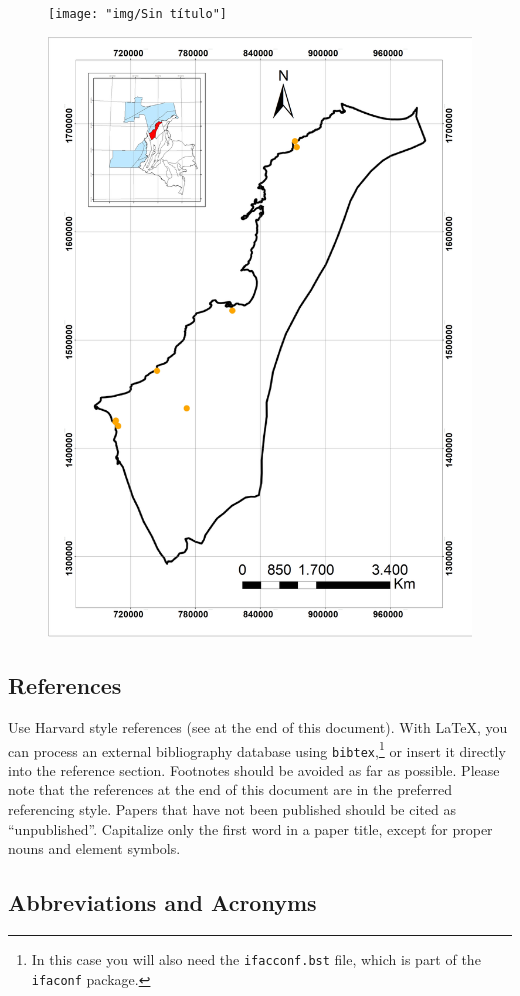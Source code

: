 \documentclass{ifacconf}
\begin{document}
\begin{figure}
	\centering
	\texttt{[image: "img/Sin título"]}
	\caption[centroidesemisiones]{}
	\label{fig:sin-titulo}
\end{figure}
\begin{figure}
	\centering
	\includegraphics[width=0.7\linewidth]{img/Volcanes}
	\caption[volcanes]{}
	\label{fig:volcanes}
\end{figure}


\subsection{References}

Use Harvard style references (see at the end of this document). With
\LaTeX, you can process an external bibliography database 
using \texttt{bibtex},\footnote{In this case you will also need the \texttt{ifacconf.bst}
file, which is part of the \texttt{ifaconf} package.}
or insert it directly into the reference section. Footnotes should be avoided as
far as possible.  Please note that the references at the end of this
document are in the preferred referencing style. Papers that have not
been published should be cited as ``unpublished''.  Capitalize only the
first word in a paper title, except for proper nouns and element
symbols.

\subsection{Abbreviations and Acronyms}
\end{document}

